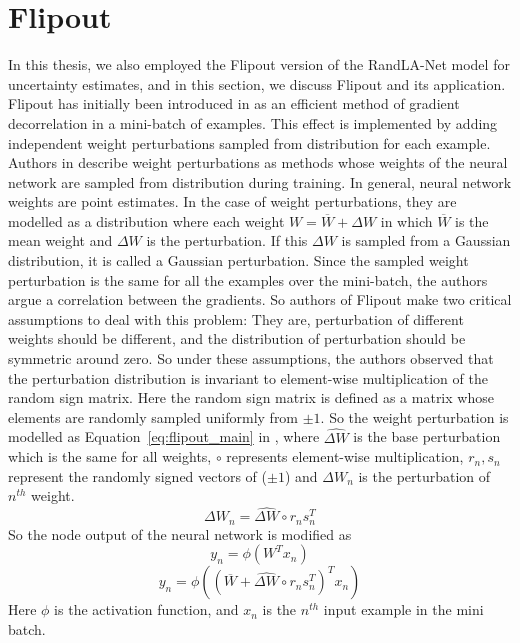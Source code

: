\section{Flipout}
\label{sec:meth_flipout}
In this thesis, we also employed the Flipout version of the RandLA-Net model for uncertainty estimates, and in this section, we discuss Flipout and its application.
Flipout has initially been introduced in \cite{Flipout} as an efficient method of gradient decorrelation in a mini-batch of examples.
This effect is implemented by adding independent weight perturbations sampled from distribution for each example.
Authors in \cite{Flipout} describe weight perturbations as methods whose weights of the neural network are sampled from distribution during training.
In general, neural network weights are point estimates. In the case of weight perturbations, they are modelled as a distribution where each weight $W=\overline{W}+\Delta W$ in which $\overline{W}$ is the mean weight and $\Delta W$ is the perturbation.
If this $\Delta W$ is sampled from a Gaussian distribution, it is called a Gaussian perturbation.
Since the sampled weight perturbation is the same for all the examples over the mini-batch, the authors argue a correlation between the gradients.
So authors of Flipout make two critical assumptions to deal with this problem:
They are, perturbation of different weights should be different, and the distribution of perturbation should be symmetric around zero.
So under these assumptions, the authors observed that the perturbation distribution is invariant to element-wise multiplication of the random sign matrix.
Here the random sign matrix is defined as a matrix whose elements are randomly sampled uniformly from $\pm 1$. 
So the weight perturbation is modelled as Equation~\ref{eq:flipout_main} in \cite{Flipout}, where $\widehat{\Delta W}$ is the base perturbation which is the same for all weights, $\circ$ represents element-wise multiplication, $r_n, s_n$ represent the randomly signed vectors of ($\pm 1$) and $\Delta W_n$ is the perturbation of $n^{th}$ weight.
\begin{equation}
    \Delta W_n = \widehat{\Delta W} \circ r_n s_{n}^T
    \label{eq:flipout_main}
\end{equation}
So the node output of the neural network is modified as 
$$y_n = \phi(W^T x_n) $$
$$y_n = \phi((\overline{W}+\widehat{\Delta W} \circ r_n s_{n}^T)^Tx_n)$$
Here $\phi$ is the activation function, and $x_n$ is the $n^{th}$ input example in the mini batch.
